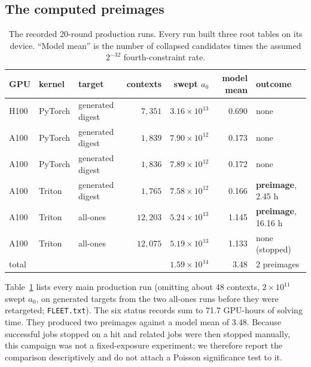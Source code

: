 \documentclass[11pt,a4paper]{article}
\begin{document}
\subsection{The computed preimages}
\label{sec:hits}

\begin{table}[t]
\centering\small
\caption{The recorded 20-round production runs.  Every run built three root
tables on its device.  ``Model mean'' is the number of collapsed candidates
times the assumed $2^{-32}$ fourth-constraint rate.}
\label{tab:campaign}
\begin{tabular}{@{}lllrrrl@{}}
\toprule
GPU & kernel & target & contexts & swept $a_0$ & model mean & outcome \\
\midrule
H100 & PyTorch & generated digest & $7{,}351$ & $3.16\times10^{13}$ & 0.690 & none \\
A100 & PyTorch & generated digest & $1{,}839$ & $7.90\times10^{12}$ & 0.173 & none \\
A100 & PyTorch & generated digest & $1{,}836$ & $7.89\times10^{12}$ & 0.172 & none \\
A100 & Triton & generated digest & $1{,}765$ & $7.58\times10^{12}$ & 0.166 & \textbf{preimage}, 2.45 h \\
A100 & Triton & all-ones & $12{,}203$ & $5.24\times10^{13}$ & 1.145 & \textbf{preimage}, 16.16 h \\
A100 & Triton & all-ones & $12{,}075$ & $5.19\times10^{13}$ & 1.133 & none (stopped) \\
\midrule
total & & & & $1.59\times10^{14}$ & 3.48 & 2 preimages \\
\bottomrule
\end{tabular}
\end{table}

Table~\ref{tab:campaign} lists every main production run (omitting about 48 contexts,
$2\times10^{11}$ swept $a_0$, on generated targets from the two all-ones runs
before they were retargeted; \texttt{FLEET.txt}).  The six status records sum
to 71.7 GPU-hours of solving time.  They produced two preimages against a
model mean of 3.48.  Because successful jobs stopped on a hit and related jobs
were then stopped manually, this campaign was not a fixed-exposure experiment;
we therefore report the comparison descriptively and do not attach a Poisson
significance test to it.
\end{document}
